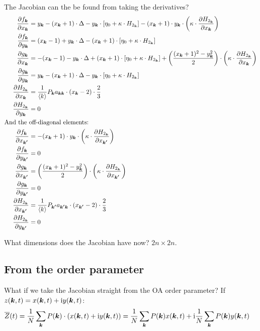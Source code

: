 The Jacobian can the be found from taking the derivatives?
\begin{align*}
\frac{\partial f_{{\boldsymbol{k}}}}{\partial x_{{\boldsymbol{k}}}} &= y_{{\boldsymbol{k}}}-(x_{{\boldsymbol{k}}}+1) \cdot \Delta-y_{{\boldsymbol{k}}} \cdot \left[\eta_{0} + \kappa \cdot H_{2_{{\boldsymbol{k}}}} \right] - (x_{{\boldsymbol{k}}}+1) \cdot y_{{\boldsymbol{k}}} \cdot \left(\kappa \cdot \frac{\partial H_{2_{{\boldsymbol{k}}}}}{\partial x_{{\boldsymbol{k}}}}\right)\\
\frac{\partial f_{{\boldsymbol{k}}}}{\partial y_{{\boldsymbol{k}}}} &= (x_{{\boldsymbol{k}}}-1)+y_{{\boldsymbol{k}}} \cdot \Delta-(x_{{\boldsymbol{k}}}+1) \cdot \left[\eta_{0} + \kappa \cdot H_{2_{{\boldsymbol{k}}}} \right] \\
\frac{\partial g_{{\boldsymbol{k}}}}{\partial x_{{\boldsymbol{k}}}} &= -(x_{{\boldsymbol{k}}} - 1) - y_{{\boldsymbol{k}}} \cdot \Delta + (x_{{\boldsymbol{k}}} + 1) \cdot \left[\eta_{0} + \kappa \cdot H_{2_{{\boldsymbol{k}}}} \right] + \left( \frac{(x_{{\boldsymbol{k}}} + 1)^2 - y_{{\boldsymbol{k}}}^2}{2} \right) \cdot \left(\kappa \cdot \frac{\partial H_{2_{{\boldsymbol{k}}}}}{\partial x_{{\boldsymbol{k}}}}\right) \\
\frac{\partial g_{{\boldsymbol{k}}}}{\partial y_{{\boldsymbol{k}}}} &= y_{{\boldsymbol{k}}} - (x_{{\boldsymbol{k}}} + 1)\cdot \Delta - y_{{\boldsymbol{k}}} \cdot \left[\eta_{0} + \kappa \cdot H_{2_{{\boldsymbol{k}}}} \right] \\
\frac{\partial H_{2_{{\boldsymbol{k}}}}}{\partial x_{{\boldsymbol{k}}}} &= \frac{1}{\langle k\rangle} P_{{\boldsymbol{k}}} a_{{\boldsymbol{k}} {\boldsymbol{k}}} \cdot(x_{{\boldsymbol{k}}}-2) \cdot \frac{2}{3} \\
\frac{\partial H_{2_{{\boldsymbol{k}}}}}{\partial y_{{\boldsymbol{k}}}} &= 0 \\
\text{And the } & \text{off-diagonal elements:} \\
\frac{\partial f_{{\boldsymbol{k}}}}{\partial x_{{\boldsymbol{k'}}}} &= - (x_{{\boldsymbol{k}}}+1) \cdot y_{{\boldsymbol{k}}} \cdot \left(\kappa \cdot \frac{\partial H_{2_{{\boldsymbol{k}}}}}{\partial x_{{\boldsymbol{k'}}}}\right)\\
\frac{\partial f_{{\boldsymbol{k}}}}{\partial y_{{\boldsymbol{k'}}}} &= 0 \\
\frac{\partial g_{{\boldsymbol{k}}}}{\partial x_{{\boldsymbol{k'}}}} &= \left( \frac{(x_{{\boldsymbol{k}}} + 1)^2 - y_{{\boldsymbol{k}}}^2}{2} \right) \cdot \left(\kappa \cdot \frac{\partial H_{2_{{\boldsymbol{k}}}}}{\partial x_{{\boldsymbol{k'}}}}\right) \\
\frac{\partial g_{{\boldsymbol{k}}}}{\partial y_{{\boldsymbol{k'}}}} &= 0\\
\frac{\partial H_{2_{{\boldsymbol{k}}}}}{\partial x_{{\boldsymbol{k'}}}} &= \frac{1}{\langle k\rangle} P_{{\boldsymbol{k'}}} a_{{\boldsymbol{k'}} {\boldsymbol{k}}} \cdot(x_{{\boldsymbol{k'}}}-2) \cdot \frac{2}{3} \\
\frac{\partial H_{2_{{\boldsymbol{k}}}}}{\partial y_{{\boldsymbol{k'}}}} &= 0
\end{align*}

What dimensions does the Jacobian have now? $2 n \times 2 n$.

 


\subsection{From the order parameter}
What if we take the Jacobian straight from the OA order parameter? If $z({\boldsymbol{k}},t) = x({\boldsymbol{k}},t) + {\rm{i}} y({\boldsymbol{k}},t)$:
\begin{align}
\overline{Z}(t) &= \frac{1}{N} \sum_{{\boldsymbol{k}}} P({\boldsymbol{k}}) \cdot \left( x({\boldsymbol{k}},t) + {\rm{i}} y({\boldsymbol{k}},t) \right) = \frac{1}{N} \sum_{{\boldsymbol{k}}} P({\boldsymbol{k}}) x({\boldsymbol{k}},t) + {\rm{i}} \frac{1}{N} \sum_{{\boldsymbol{k}}} P({\boldsymbol{k}}) y({\boldsymbol{k}},t)  
\end{align}




\small{}

\label{LastPage}~


